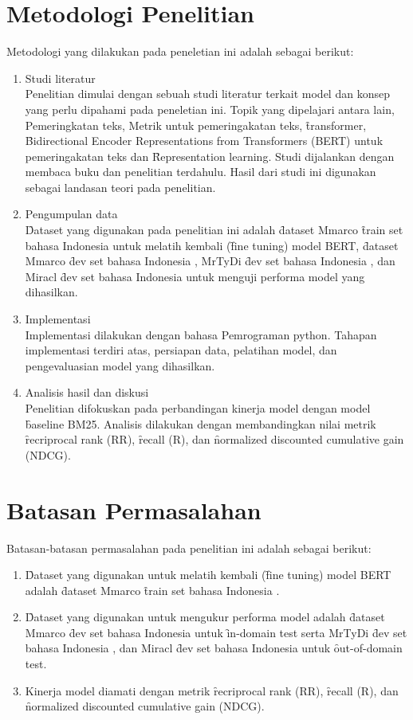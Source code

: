 \section{Metodologi Penelitian}
Metodologi yang dilakukan pada peneletian ini adalah sebagai berikut:
\begin{enumerate}
	\item Studi literatur \\
	Penelitian dimulai dengan sebuah studi literatur terkait model dan konsep yang perlu dipahami pada peneletian ini. Topik yang dipelajari antara lain, Pemeringkatan teks, Metrik untuk pemeringakatan teks, \f{transformer}, \f{Bidirectional Encoder Representations from Transformers} (BERT) untuk pemeringakatan teks dan \f{Representation learning}. Studi dijalankan dengan membaca buku dan penelitian terdahulu. Hasil dari studi ini digunakan sebagai landasan teori pada penelitian.
	\item Pengumpulan data \\
	\f{Dataset} yang digunakan pada penelitian ini adalah \f{dataset} Mmarco \f{train set} bahasa Indonesia \citep{mmarco} untuk melatih kembali (\f{fine tuning}) model BERT, \f{dataset} Mmarco \f{dev set} bahasa Indonesia \citep{mmarco}, MrTyDi \f{dev set} bahasa Indonesia \citep{mrtydi}, dan Miracl \f{dev set} bahasa Indonesia \citep{miracl} untuk menguji performa model yang dihasilkan.
	\item Implementasi \\
	Implementasi dilakukan dengan bahasa Pemrograman python. Tahapan implementasi terdiri atas, persiapan data, pelatihan model, dan pengevaluasian model yang dihasilkan.
	\item Analisis hasil dan diskusi \\
	Penelitian difokuskan pada perbandingan kinerja model dengan model \f{baseline} BM25. Analisis dilakukan dengan membandingkan nilai metrik \f{recriprocal rank} (RR), \f{recall} (R), dan \f{normalized discounted cumulative gain} (NDCG).
\end{enumerate}

\section{Batasan Permasalahan}
Batasan-batasan permasalahan pada penelitian ini adalah sebagai berikut:
\begin{enumerate}
	\item \f{Dataset} yang digunakan untuk melatih kembali (\f{fine tuning}) model BERT adalah \f{dataset} Mmarco \f{train set} bahasa Indonesia \citep{mmarco}.
	\item \f{Dataset} yang digunakan untuk mengukur performa model adalah \f{dataset} Mmarco \f{dev set} bahasa Indonesia \citep{mmarco} untuk \f{in-domain test} serta MrTyDi \f{dev set} bahasa Indonesia \citep{mrtydi}, dan Miracl \f{dev set} bahasa Indonesia \citep{miracl} untuk \f{out-of-domain test}.
	\item Kinerja model diamati dengan metrik \f{recriprocal rank} (RR), \f{recall} (R), dan \f{normalized discounted cumulative gain} (NDCG).
\end{enumerate}
